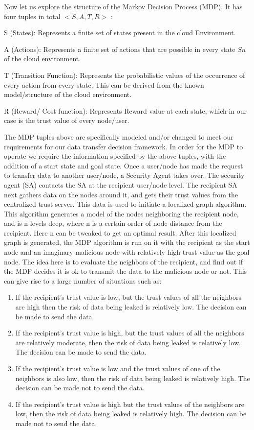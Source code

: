 Now let us explore the structure of the Markov Decision Process (MDP). It
has four tuples in total $< S, A, T, R >$ \autocite{QimingHe2000}:
\begin{description}
    \item{S (States):} Represents a finite set of states present in the cloud Environment.
    \item{A (Actions):} Represents a finite set of actions that are possible in
        every state $Sn$ of the cloud environment.
    \item{T (Transition Function):} Represents the probabilistic values of the occurrence of every action from every state. This can be derived from the known model/structure of the cloud environment.
    \item{R (Reward/ Cost function):} Represents Reward value at each state, which
    in our case is the trust value of every node/user.  
\end{description}
The MDP tuples above are
specifically modeled and/or changed to meet our requirements for our data
transfer decision framework. In order for the MDP to operate we require the
information specified by the above tuples, with the addition of a start
state and goal state. Once a user/node has made the request to transfer data
to another user/node, a Security Agent takes over. The security agent (SA)
contacts the SA at the recipient user/node level. The recipient SA next
gathers data on the nodes around it, and gets their trust values from the
centralized trust server. This data is used to initiate a localized graph
algorithm. This algorithm generates a model of the nodes neighboring the
recipient node, and is n-levels deep, where n is a certain order of node
distance from the recipient. Here n can be tweaked to get an optimal result.
After this localized graph is generated, the MDP algorithm is run on it with
the recipient as the start node and an imaginary malicious node with
relatively high trust value as the goal node. The idea here is to evaluate
the neighbors of the recipient, and find out if the MDP decides it is ok to
transmit the data to the malicious node or not. This can give rise to
a large number of situations such as:
\begin{enumerate}
    \item If the recipient’s trust value is low, but the trust values of all the
        neighbors are high then the risk of data being leaked is relatively low. The
        decision can be made to send the data.
    \item If the recipient’s trust value is high, but the trust values of all the
        neighbors are relatively moderate, then the risk of data being leaked is
        relatively low. The decision can be made to send the data.
    \item If the recipient’s trust value is low and the trust values of one of the
        neighbors is also low, then the risk of data being leaked is relatively
        high. The decision can be made not to send the data.
    \item If the recipient’s trust value is high but the trust values of the neighbors
are low, then the risk of data being leaked is relatively high. The decision
can be made not to send the data.  
\end{enumerate}
